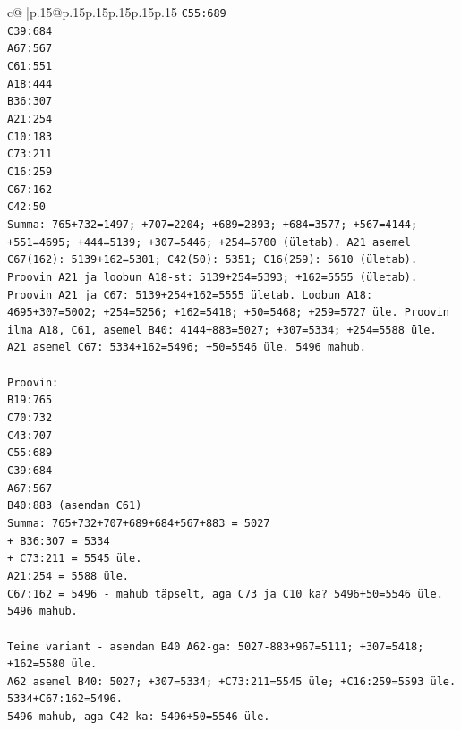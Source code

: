 \documentclass{article}
\begin{document}
{\begin{supertabular}{c@{$\;$}|p{.15\linewidth}@{}p{.15\linewidth}p{.15\linewidth}p{.15\linewidth}p{.15\linewidth}p{.15\linewidth}}
{{{\texttt{C55:689} \\
\texttt{C39:684} \\
\texttt{A67:567} \\
\texttt{C61:551} \\
\texttt{A18:444} \\
\texttt{B36:307} \\
\texttt{A21:254} \\
\texttt{C10:183} \\
\texttt{C73:211} \\
\texttt{C16:259} \\
\texttt{C67:162} \\
\texttt{C42:50} \\
\texttt{Summa: 765+732=1497; +707=2204; +689=2893; +684=3577; +567=4144; +551=4695; +444=5139; +307=5446; +254=5700 (ületab). A21 asemel C67(162): 5139+162=5301; C42(50): 5351; C16(259): 5610 (ületab). Proovin A21 ja loobun A18{-}st: 5139+254=5393; +162=5555 (ületab). Proovin A21 ja C67: 5139+254+162=5555 ületab. Loobun A18: 4695+307=5002; +254=5256; +162=5418; +50=5468; +259=5727 üle. Proovin ilma A18, C61, asemel B40: 4144+883=5027; +307=5334; +254=5588 üle. A21 asemel C67: 5334+162=5496; +50=5546 üle. 5496 mahub.} \\
\\ 
\texttt{Proovin:} \\
\texttt{B19:765} \\
\texttt{C70:732} \\
\texttt{C43:707} \\
\texttt{C55:689} \\
\texttt{C39:684} \\
\texttt{A67:567} \\
\texttt{B40:883 (asendan C61)} \\
\texttt{Summa: 765+732+707+689+684+567+883 = 5027} \\
\texttt{+ B36:307 = 5334} \\
\texttt{+ C73:211 = 5545 üle.} \\
\texttt{A21:254 = 5588 üle.} \\
\texttt{C67:162 = 5496 {-} mahub täpselt, aga C73 ja C10 ka? 5496+50=5546 üle. 5496 mahub.} \\
\\ 
\texttt{Teine variant {-} asendan B40 A62{-}ga: 5027{-}883+967=5111; +307=5418; +162=5580 üle.} \\
\texttt{A62 asemel B40: 5027; +307=5334; +C73:211=5545 üle; +C16:259=5593 üle. 5334+C67:162=5496.} \\
\texttt{5496 mahub, aga C42 ka: 5496+50=5546 üle.} \\
}}}
\end{supertabular}}
\end{document}
